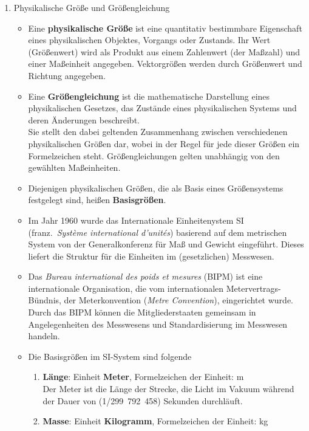 \documentclass[a4paper,12pt,DIV=15]{scrartcl}
\begin{document}
\begin{enumerate}
\item Physikalische Größe und Größengleichung
	\begin{itemize}
	\item Eine \textbf{physikalische Größe} ist eine quantitativ bestimmbare Eigenschaft
	eines physikalischen Objektes, Vorgangs oder Zustands.
	Ihr Wert (Größenwert) wird als Produkt aus einem Zahlenwert (der Maßzahl) und
	einer Maßeinheit angegeben. Vektorgrößen werden durch Größenwert und Richtung angegeben.
	\item Eine \textbf{Größengleichung} ist die mathematische Darstellung eines physikalischen Gesetzes,
	das Zustände eines physikalischen Systems und deren Änderungen beschreibt.\\
	Sie stellt den dabei geltenden Zusammenhang zwischen verschiedenen physikalischen Größen dar,
	wobei in der Regel für jede dieser Größen ein Formelzeichen steht. Größengleichungen gelten unabhängig
	von den gewählten Maßeinheiten.
	\item Diejenigen physikalischen Größen, die als Basis eines Größensystems festgelegt sind,
	heißen \textbf{Basisgrößen}.
	\item Im Jahr 1960 wurde das Internationale Einheitenystem SI (franz.\
	\textsl{Syst{\`e}me international d'unit{\'e}s}) basierend auf dem metrischen System
	von der Generalkonferenz für Maß und Gewicht eingeführt. Dieses liefert die
	Struktur für die Einheiten im (gesetzlichen) Messwesen.
	\item Das \textsl{Bureau international des poids et mesures} (BIPM) ist eine internationale
	Organisation, die vom internationalen Metervertrags-Bündnis, der Meterkonvention (\textsl{Metre Convention}), eingerichtet wurde.
	Durch das BIPM können die Mitgliederstaaten gemeinsam in Angelegenheiten des Messwesens und
	Standardisierung im Messwesen handeln.
	\item Die Basisgrößen im SI-System sind folgende
		\begin{enumerate}[1.)]
		\item \textbf{Länge}: Einheit \textbf{Meter}, Formelzeichen der Einheit: m\\
			Der Meter ist die Länge der Strecke, die Licht im Vakuum
			während der Dauer von (1/299~792~458) Sekunden durchläuft.
		\item \textbf{Masse}: Einheit \textbf{Kilogramm}, Formelzeichen der Einheit: kg\\

\end{enumerate}
\end{itemize}
\end{enumerate}
\end{document}
